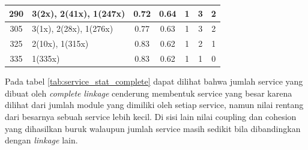 \begin{small}
\begin{longtable}{|c|p{4cm}|c|c|c|c|c|}
290 & 3(2x), 2(41x), 1(247x) & \cellcolor{colorBad}  0.72 & \cellcolor{colorBad} 0.64 & 1 & 3 & \cellcolor{colorGood} 2 \\   \hline
305 & 3(1x), 2(28x), 1(276x) & \cellcolor{colorBad}  0.77 & \cellcolor{colorBad} 0.63 & 1 & 3 & \cellcolor{colorGood} 2 \\   \hline
325 & 2(10x), 1(315x) & \cellcolor{colorBad}  0.83 & \cellcolor{colorBad} 0.62 & 1 & 2 & \cellcolor{colorGood} 1 \\   \hline
335 & 1(335x) & \cellcolor{colorBad}  0.83 & \cellcolor{colorBad} 0.62 & 1 & 1 & \cellcolor{colorGood} 0 \\   \hline
	\end{longtable}
\end{small}
\endgroup

Pada tabel \ref{tab:service_stat_complete} dapat dilihat bahwa jumlah service yang dibuat oleh \textit{complete} \textit{linkage} cenderung membentuk service yang besar karena dilihat dari jumlah module yang dimiliki oleh setiap service, namun nilai rentang dari besarnya sebuah service lebih kecil. Di sisi lain nilai coupling dan cohesion yang dihasilkan buruk walaupun jumlah service masih sedikit bila dibandingkan dengan \textit{linkage} lain.

